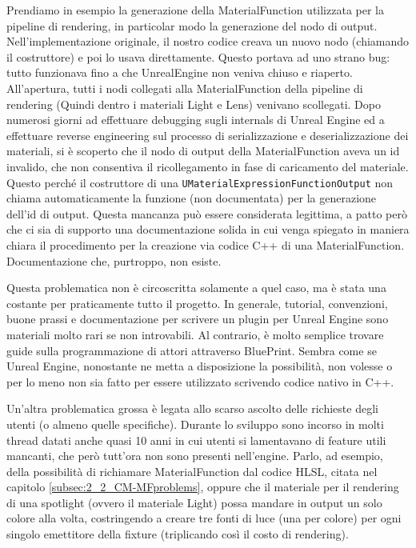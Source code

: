 \documentclass[main.tex]{subfiles}
\begin{document}
Prendiamo in esempio la generazione della MaterialFunction utilizzata per la pipeline di rendering, in particolar modo la generazione del nodo di output. Nell'implementazione originale, il nostro codice creava un nuovo nodo (chiamando il costruttore) e poi lo usava direttamente. Questo portava ad uno strano bug: tutto funzionava fino a che UnrealEngine non veniva chiuso e riaperto. All'apertura, tutti i nodi collegati alla MaterialFunction della pipeline di rendering (Quindi dentro i materiali Light e Lens) venivano scollegati. Dopo numerosi giorni ad effettuare debugging sugli internals di Unreal Engine ed a effettuare reverse engineering sul processo di serializzazione e deserializzazione dei materiali, si è scoperto che il nodo di output della MaterialFunction aveva un id invalido, che non consentiva il ricollegamento in fase di caricamento del materiale. Questo perché il costruttore di una \lstinline{UMaterialExpressionFunctionOutput} non chiama automaticamente la funzione (non documentata) per la generazione dell'id di output. Questa mancanza può essere considerata legittima, a patto però che ci sia di supporto una documentazione solida in cui venga spiegato in maniera chiara il procedimento per la creazione via codice C++ di una MaterialFunction. Documentazione che, purtroppo, non esiste.

Questa problematica non è circoscritta solamente a quel caso, ma è stata una costante per praticamente tutto il progetto. In generale, tutorial, convenzioni, buone prassi e documentazione per scrivere un plugin per Unreal Engine sono materiali molto rari se non introvabili. Al contrario, è molto semplice trovare guide sulla programmazione di attori attraverso BluePrint. Sembra come se Unreal Engine, nonostante ne metta a disposizione la possibilità, non volesse o per lo meno non sia fatto per essere utilizzato scrivendo codice nativo in C++.
\newline

Un'altra problematica grossa è legata allo scarso ascolto delle richieste degli utenti (o almeno quelle specifiche). Durante lo sviluppo sono incorso in molti thread datati anche quasi 10 anni in cui utenti si lamentavano di feature utili mancanti, che però tutt'ora non sono presenti nell'engine. Parlo, ad esempio, della possibilità di richiamare MaterialFunction dal codice HLSL, citata nel capitolo \ref{subsec:2_2_CM-MFproblems}, oppure che il materiale per il rendering di una spotlight (ovvero il materiale Light) possa mandare in output un solo colore alla volta, costringendo a creare tre fonti di luce (una per colore) per ogni singolo emettitore della fixture (triplicando così il costo di rendering). \cite{rgbSpotlight}
\end{document}
